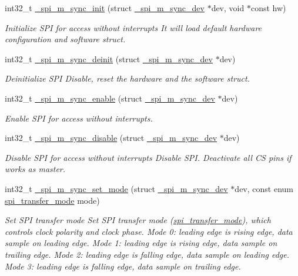 \begin{DoxyCompactItemize}
int32\+\_\+t \hyperlink{group__hpl__spi_ga1ba635e6ad210d1428315ddd399647e2}{\+\_\+spi\+\_\+m\+\_\+sync\+\_\+init} (struct \hyperlink{group__hpl__spi_ga7674622aeda62f2981f106e2d8221a5e}{\+\_\+spi\+\_\+m\+\_\+sync\+\_\+dev} $\ast$dev, void $\ast$const hw)
\begin{DoxyCompactList}\small\item\em Initialize S\+PI for access without interrupts It will load default hardware configuration and software struct. \end{DoxyCompactList}\item 
int32\+\_\+t \hyperlink{group__hpl__spi_gaf4e206004864513902ccd1c79a4d59d8}{\+\_\+spi\+\_\+m\+\_\+sync\+\_\+deinit} (struct \hyperlink{group__hpl__spi_ga7674622aeda62f2981f106e2d8221a5e}{\+\_\+spi\+\_\+m\+\_\+sync\+\_\+dev} $\ast$dev)
\begin{DoxyCompactList}\small\item\em Deinitialize S\+PI Disable, reset the hardware and the software struct. \end{DoxyCompactList}\item 
int32\+\_\+t \hyperlink{group__hpl__spi_ga3c9ed3535e73ac73198d7a06829ce260}{\+\_\+spi\+\_\+m\+\_\+sync\+\_\+enable} (struct \hyperlink{group__hpl__spi_ga7674622aeda62f2981f106e2d8221a5e}{\+\_\+spi\+\_\+m\+\_\+sync\+\_\+dev} $\ast$dev)
\begin{DoxyCompactList}\small\item\em Enable S\+PI for access without interrupts. \end{DoxyCompactList}\item 
int32\+\_\+t \hyperlink{group__hpl__spi_ga1f98d26555a08dae45c7d80da8a6b1e9}{\+\_\+spi\+\_\+m\+\_\+sync\+\_\+disable} (struct \hyperlink{group__hpl__spi_ga7674622aeda62f2981f106e2d8221a5e}{\+\_\+spi\+\_\+m\+\_\+sync\+\_\+dev} $\ast$dev)
\begin{DoxyCompactList}\small\item\em Disable S\+PI for access without interrupts Disable S\+PI. Deactivate all CS pins if works as master. \end{DoxyCompactList}\item 
int32\+\_\+t \hyperlink{group__hpl__spi_gafa658db2528d45e511ca80ade9feb2f8}{\+\_\+spi\+\_\+m\+\_\+sync\+\_\+set\+\_\+mode} (struct \hyperlink{group__hpl__spi_ga7674622aeda62f2981f106e2d8221a5e}{\+\_\+spi\+\_\+m\+\_\+sync\+\_\+dev} $\ast$dev, const enum \hyperlink{group__hpl__spi_ga9c30fdfffba6be76b4044ccb17b218e5}{spi\+\_\+transfer\+\_\+mode} mode)
\begin{DoxyCompactList}\small\item\em Set S\+PI transfer mode Set S\+PI transfer mode (\hyperlink{group__hpl__spi_ga9c30fdfffba6be76b4044ccb17b218e5}{spi\+\_\+transfer\+\_\+mode}), which controls clock polarity and clock phase. Mode 0\+: leading edge is rising edge, data sample on leading edge. Mode 1\+: leading edge is rising edge, data sample on trailing edge. Mode 2\+: leading edge is falling edge, data sample on leading edge. Mode 3\+: leading edge is falling edge, data sample on trailing edge. \end{DoxyCompactList}\item 

\end{DoxyCompactItemize}

